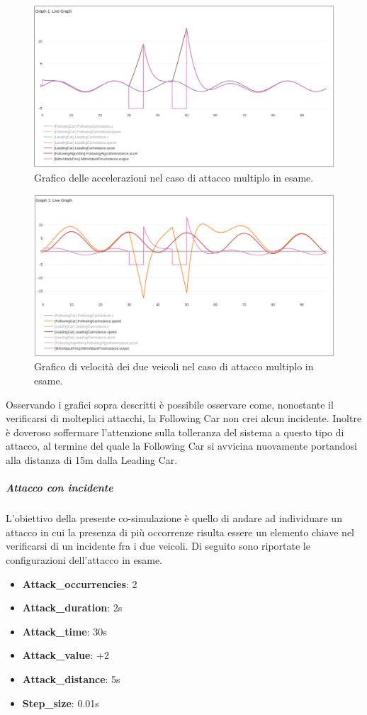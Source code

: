 \begin{figure}[H]
	\centering
	\includegraphics[width=\textwidth]{img/MultiAttackAccelPlotAccelNoCrash.png}
	\caption{Grafico delle accelerazioni nel caso di attacco multiplo in esame.}
\end{figure}
\begin{figure}[H]
	\centering
	\includegraphics[width=\textwidth]{img/MultiAttackAccelPlotSpeedNoCrash.png}
	\caption{Grafico di velocità dei due veicoli nel caso di attacco multiplo in esame.}
\end{figure}

Osservando i grafici sopra descritti è possibile osservare come, nonostante il verificarsi di molteplici attacchi, la Following Car non crei alcun incidente. Inoltre è doveroso soffermare l'attenzione sulla tolleranza del sistema a questo tipo di attacco, al termine del quale la Following Car si avvicina nuovamente portandosi alla distanza di 15m dalla Leading Car.

\subparagraph{Attacco con incidente}
L'obiettivo della presente co-simulazione è quello di andare ad individuare un attacco in cui la presenza di più occorrenze risulta essere un elemento chiave nel verificarsi di un incidente fra i due veicoli. Di seguito sono riportate le configurazioni dell'attacco in esame.
\begin{itemize}
\item \textbf{Attack\_occurrencies}: 2
\item \textbf{Attack\_duration}: 2s
\item \textbf{Attack\_time}: 30s
\item \textbf{Attack\_value}: +2
\item \textbf{Attack\_distance}: 5s
\item \textbf{Step\_size}: 0.01s
\end{itemize}

